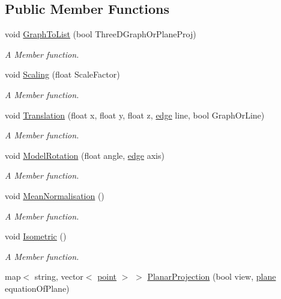 \subsection*{Public Member Functions}
\begin{DoxyCompactItemize}
\item 
void \hyperlink{classThreeDGraph__class_a521cb31c72fa3828840a3bf4403e1395}{Graph\+To\+List} (bool Three\+D\+Graph\+Or\+Plane\+Proj)
\begin{DoxyCompactList}\small\item\em A Member function. \end{DoxyCompactList}\item 
void \hyperlink{classThreeDGraph__class_afa131e00002ddff96be961a903e2c589}{Scaling} (float Scale\+Factor)
\begin{DoxyCompactList}\small\item\em A Member function. \end{DoxyCompactList}\item 
void \hyperlink{classThreeDGraph__class_aa3f177ba316ff1fc411926ba9d08c80f}{Translation} (float x, float y, float z, \hyperlink{structedge}{edge} line, bool Graph\+Or\+Line)
\begin{DoxyCompactList}\small\item\em A Member function. \end{DoxyCompactList}\item 
void \hyperlink{classThreeDGraph__class_a400bececda29db8682455d92872f0a5e}{Model\+Rotation} (float angle, \hyperlink{structedge}{edge} axis)
\begin{DoxyCompactList}\small\item\em A Member function. \end{DoxyCompactList}\item 
void \hyperlink{classThreeDGraph__class_ad30f5f058cfe9a0de8a91dd062fb10c5}{Mean\+Normalisation} ()
\begin{DoxyCompactList}\small\item\em A Member function. \end{DoxyCompactList}\item 
void \hyperlink{classThreeDGraph__class_aec760645bb97742c87a50fe66aa68efe}{Isometric} ()
\begin{DoxyCompactList}\small\item\em A Member function. \end{DoxyCompactList}\item 
map$<$ string, vector$<$ \hyperlink{structpoint}{point} $>$ $>$ \hyperlink{classThreeDGraph__class_aaf74e95488c7b93e3baf6e298db2d0b6}{Planar\+Projection} (bool view, \hyperlink{structplane}{plane} equation\+Of\+Plane)

\end{DoxyCompactItemize}

